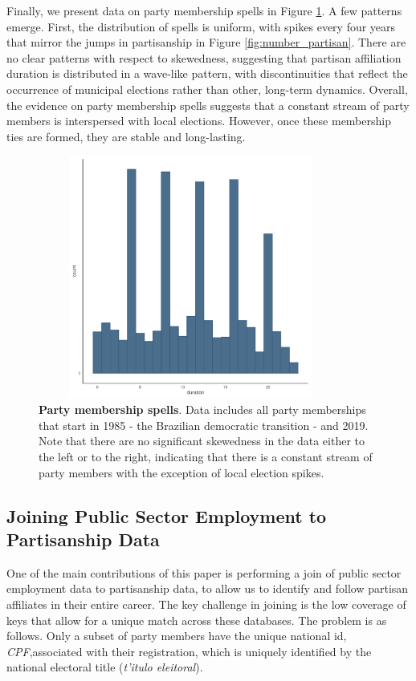 Finally, we present data on party membership spells in Figure \ref{fig:party_spell}. A few patterns emerge. First, the distribution of spells is uniform, with spikes every four years that mirror the jumps in partisanship in Figure \ref{fig:number_partisan}. There are no clear patterns with respect to skewedness, suggesting that partisan affiliation duration is distributed in a wave-like pattern, with discontinuities that reflect the occurrence of municipal elections rather than other, long-term dynamics. Overall, the evidence on party membership spells suggests that a constant stream of party members is interspersed with local elections. However, once these membership ties are formed, they are stable and long-lasting.

\begin{figure}
    \centering
    \includegraphics[width = 10cm, height = 8cm]{chapters/chapter_3/figures/partisanship/plot_partisan_spell.pdf}
    \caption{\textbf{Party membership spells}. Data includes all party memberships that start in 1985 - the Brazilian democratic transition - and 2019. Note that there are no significant skewedness in the data either to the left or to the right, indicating that there is a constant stream of party members with the exception of local election spikes.}
    \label{fig:party_spell}
\end{figure}

\subsection{Joining Public Sector Employment to Partisanship Data}
One of the main contributions of this paper is performing a join of public sector employment data to partisanship data, to allow us to identify and follow partisan affiliates in their entire career. The key challenge in joining is the low coverage of keys that allow for a unique match across these databases. The problem is as follows. Only a subset of party members have the unique national id, \emph{CPF},associated with their registration, which is uniquely identified by the national electoral title (\emph{t'{i}tulo eleitoral}).

